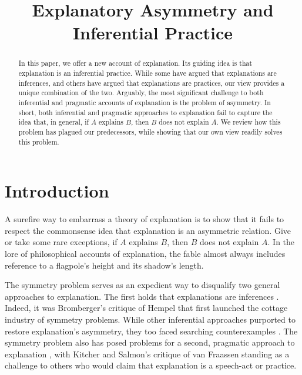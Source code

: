 \documentclass{article}                     %
\begin{document}
\sloppy
\title{Explanatory Asymmetry and Inferential Practice
}


\raggedbottom

\maketitle

\begin{abstract}

In this paper, we offer a new account of explanation. Its guiding idea is that explanation is an inferential practice. While some have argued that explanations are inferences, and others have argued that explanations are practices, our view provides a unique combination of the two. Arguably, the most significant challenge to both inferential and pragmatic accounts of explanation is the problem of asymmetry. In short, both inferential and pragmatic approaches to explanation fail to capture the idea that, in general, if $A$ explains $B$, then $B$ does not explain $A$. We review how this problem has plagued our predecessors, while showing that our own view readily solves this problem.
\end{abstract}


\section{Introduction}
\label{sec:introduction}

A surefire way to embarrass a theory of explanation is to show that it fails to respect the commonsense idea that explanation is an asymmetric relation. Give or take some rare exceptions, if $A$ explains $B$, then $B$ does not explain $A$. In the lore of philosophical accounts of explanation, the fable almost always includes reference to a flagpole's height and its shadow's length. 

The symmetry problem serves as an expedient way to disqualify two general approaches to explanation. The first holds that explanations are inferences \citep{Friedman1974,Hempel1965,Kitcher1989,Schurz1999,Schurz1994}. Indeed, it was Bromberger's \citeyearpar{Bromberger1965} critique of Hempel that first launched the cottage industry of symmetry problems. While other inferential approaches \citep[e.g.][]{Kitcher1989} purported to restore explanation's asymmetry, they too faced searching counterexamples \citep[see][]{Barnes1992}.  The symmetry problem also has posed problems for a second, pragmatic approach to explanation \citep{Achinstein1983,Faye2007,Garfinkel1981,Risjord2000,Fraassen1980}, with Kitcher and Salmon's \citeyearpar{Kitcher1987} critique of van Fraassen standing as a challenge to others who would claim that explanation is a speech-act or practice. 
\end{document}
